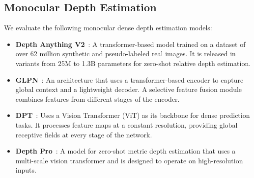 \subsection{Monocular Depth Estimation}
We evaluate the following monocular dense depth estimation models:
\label{sec:monocular_depth_estimation}
\begin{itemize}
	\item \textbf{Depth Anything V2}~\cite{yang_depth_2024}: A transformer-based model trained on a dataset of over 62 million synthetic and pseudo-labeled real images. It is released in variants from 25M to 1.3B parameters for zero-shot relative depth estimation.

	\item \textbf{GLPN}~\cite{kim_global-local_2022}: An architecture that uses a transformer-based encoder to capture global context and a lightweight decoder. A selective feature fusion module combines features from different stages of the encoder.

	\item \textbf{DPT}~\cite{ranftl_vision_2021}: Uses a Vision Transformer (ViT) as its backbone for dense prediction tasks. It processes feature maps at a constant resolution, providing global receptive fields at every stage of the network.

	\item \textbf{Depth Pro}~\cite{bochkovskii_depth_2025}: A model for zero-shot metric depth estimation that uses a multi-scale vision transformer and is designed to operate on high-resolution inputs.
\end{itemize}


